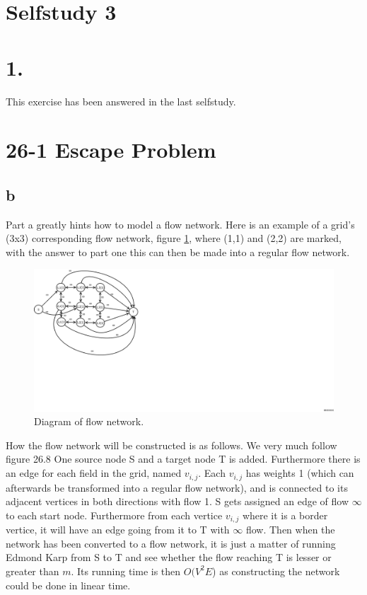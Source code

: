 \documentclass[12pt,a4paper]{report}
\begin{document}
\section*{Selfstudy 3}
\section*{1.}
This exercise has been answered in the last selfstudy.
\section*{26-1 Escape Problem}
\subsection*{b}
Part a greatly hints how to model a flow network.
Here is an example of a grid's (3x3) corresponding flow network, figure \ref{diagram}, where (1,1) and (2,2) are marked, with the answer to part one this can then be made into a regular flow network.

\begin{figure}[h]
     \centering
     \includegraphics[scale=0.5]{diagram}
     \caption{Diagram of flow network.}     
     \label{diagram}
     
\end{figure}

How the flow network will be constructed is as follows.
We very much follow figure 26.8
One source node S and a target node T is added.
Furthermore there is an edge for each field in the grid, named $v_{i,j}$. 
Each $v_{i,j}$ has weights 1 (which can afterwards be transformed into a regular flow network), and is connected to its adjacent vertices in both directions with flow 1.
S gets assigned an edge of flow $\infty$ to each start node.
Furthermore from each vertice $v_{i,j}$ where it is a border vertice, it will have an edge going from it to T with $\infty$ flow.
Then when the network has been converted to a flow network, it is just a matter of running Edmond Karp from S to T and see whether the flow reaching T is lesser or greater than $m$.
Its running time is then $O(V^2E$) as constructing the network could be done in linear time.
\end{document}
